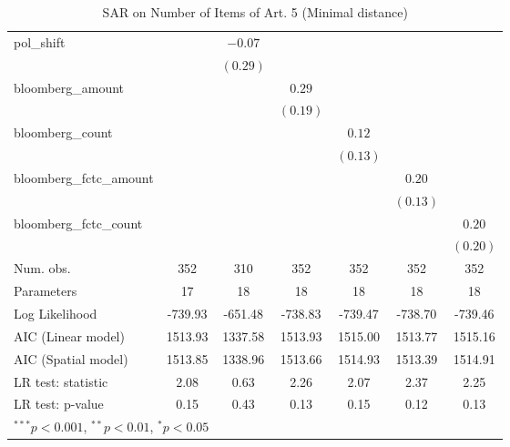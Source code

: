 \begin{table}[!h]
\begin{center}
\begin{tabular}{l c c c c c c }
pol\_shift              &              & $-0.07$      &              &              &              &              \\
                        &              & $(0.29)$     &              &              &              &              \\
bloomberg\_amount       &              &              & $0.29$       &              &              &              \\
                        &              &              & $(0.19)$     &              &              &              \\
bloomberg\_count        &              &              &              & $0.12$       &              &              \\
                        &              &              &              & $(0.13)$     &              &              \\
bloomberg\_fctc\_amount &              &              &              &              & $0.20$       &              \\
                        &              &              &              &              & $(0.13)$     &              \\
bloomberg\_fctc\_count  &              &              &              &              &              & $0.20$       \\
                        &              &              &              &              &              & $(0.20)$     \\
\midrule
Num. obs.               & 352          & 310          & 352          & 352          & 352          & 352          \\
Parameters              & 17           & 18           & 18           & 18           & 18           & 18           \\
Log Likelihood          & -739.93      & -651.48      & -738.83      & -739.47      & -738.70      & -739.46      \\
AIC (Linear model)      & 1513.93      & 1337.58      & 1513.93      & 1515.00      & 1513.77      & 1515.16      \\
AIC (Spatial model)     & 1513.85      & 1338.96      & 1513.66      & 1514.93      & 1513.39      & 1514.91      \\
LR test: statistic      & 2.08         & 0.63         & 2.26         & 2.07         & 2.37         & 2.25         \\
LR test: p-value        & 0.15         & 0.43         & 0.13         & 0.15         & 0.12         & 0.13         \\
\bottomrule
\multicolumn{7}{l}{\scriptsize{$^{***}p<0.001$, $^{**}p<0.01$, $^*p<0.05$}}
\end{tabular}
\caption{SAR on Number of Items of Art. 5 (Minimal distance)}
\label{table:coefficients}
\end{center}
\end{table}
